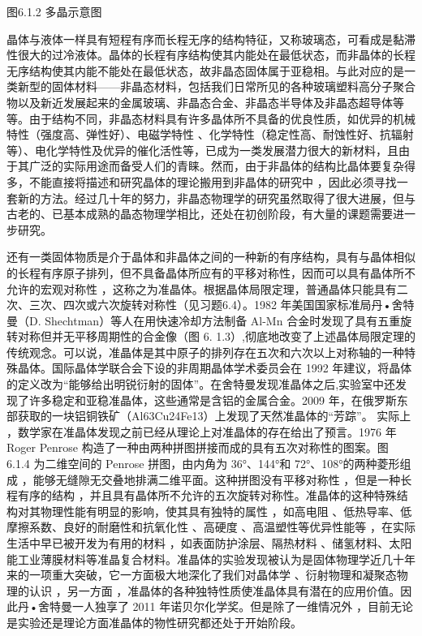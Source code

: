 图6.1.2 多晶示意图

晶体与液体一样具有短程有序而长程无序的结构特征，又称玻璃态，可看成是黏滞性很大的过冷液体。晶体的长程有序结构使其内能处在最低状态，而非晶体的长程无序结构使其内能不能处在最低状态，故非晶态固体属于亚稳相。与此对应的是一类新型的固体材料——非晶态材料，包括我们日常所见的各种玻璃塑料高分子聚合物以及新近发展起来的金属玻璃、非晶态合金、非晶态半导体及非晶态超导体等等。由于结构不同，非晶态材料具有许多晶体所不具备的优良性质，如优异的机械特性（强度高、弹性好）、电磁学特性 、化学特性（稳定性高、耐蚀性好、抗辐射等）、电化学特性及优异的催化活性等，已成为一类发展潜力很大的新材料，且由于其广泛的实际用途而备受人们的青睐。然而，由于非晶体的结构比晶体要复杂得多，不能直接将描述和研究晶体的理论搬用到非晶体的研究中 ，因此必须寻找一套新的方法。经过几十年的努力，非晶态物理学的研究虽然取得了很大进展，但与古老的、已基本成熟的晶态物理学相比，还处在初创阶段，有大量的课题需要进一步研究。

还有一类固体物质是介于晶体和非晶体之间的一种新的有序结构，具有与晶体相似的长程有序原子排列，但不具备晶体所应有的平移对称性，因而可以具有晶体所不允许的宏观对称性 ，这称之为准晶体。根据晶体局限定理，普通晶体只能具有二次、三次、四次或六次旋转对称性（见习题6.4）。1982 年美国国家标准局丹•舍特曼（D. Shechtman）等人在用快速冷却方法制备 Al-Mn 合金时发现了具有五重旋转对称但并无平移周期性的合金像（图 6. 1.3）,彻底地改变了上述晶体局限定理的传统观念。可以说，准晶体是其中原子的排列存在五次和六次以上对称轴的一种特殊晶体。国际晶体学联合会下设的非周期晶体学术委员会在 1992 年建议，将晶体的定义改为“能够给出明锐衍射的固体”。在舍特曼发现准晶体之后,实验室中还发现了许多稳定和亚稳准晶体，这些通常是含铝的金属合金。2009 年，在俄罗斯东部获取的一块铝铜铁矿（Al63Cu24Fe13）上发现了天然准晶体的“芳踪”。 实际上 ，数学家在准晶体发现之前已经从理论上对准晶体的存在给出了预言。1976 年 Roger Penrose 构造了一种由两种拼图拼接而成的具有五次对称性的图案。图 6.1.4 为二维空间的 Penrose 拼图，由内角为 36°、144°和 72°、108°的两种菱形组成 ，能够无缝隙无交叠地排满二维平面。这种拼图没有平移对称性 ，但是一种长程有序的结构 ，并且具有晶体所不允许的五次旋转对称性。准晶体的这种特殊结构对其物理性能有明显的影响，使其具有独特的属性 ，如高电阻 、低热导率、低摩擦系数、良好的耐磨性和抗氧化性 、高硬度 、高温塑性等优异性能等 ，在实际生活中早已被开发为有用的材料 ，如表面防护涂层、隔热材料 、储氢材料、太阳能工业薄膜材料等准晶复合材料。准晶体的实验发现被认为是固体物理学近几十年来的一项重大突破，它一方面极大地深化了我们对晶体学 、衍射物理和凝聚态物理的认识 ，另一方面 ，准晶体的各种独特性质使准晶体具有潜在的应用价值。因此丹•舍特曼一人独享了 2011 年诺贝尔化学奖。但是除了一维情况外 ，目前无论是实验还是理论方面准晶体的物性研究都还处于开始阶段。



